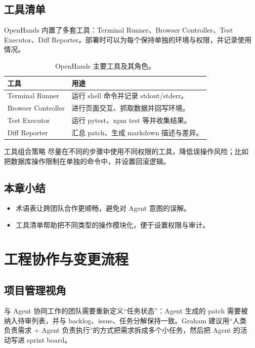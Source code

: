 \documentclass[a4paper]{article}
\begin{document}
\subsection{工具清单}
OpenHands 内置了多套工具：Terminal Runner、Browser Controller、Test Executor、Diff Reporter。部署时可以为每个保持单独的环境与权限，并记录使用情况。

\begin{table}[H]
\centering
\begin{tabular}{p{} p{}}
\toprule
工具 & 用途 \\
\midrule
Terminal Runner & 运行 shell 命令并记录 stdout/stderr。 \\
\midrule
Browser Controller & 进行页面交互、抓取数据并回写环境。 \\
\midrule
Test Executor & 运行 pytest、npm test 等并收集结果。 \\
\midrule
Diff Reporter & 汇总 patch、生成 markdown 描述与差异。 \\
\bottomrule
\end{tabular}
\caption{OpenHands 主要工具及其角色。}
\end{table}

\begin{knowledgebox}{工具组合策略}
尽量在不同的步骤中使用不同权限的工具，降低误操作风险；比如把数据库操作限制在单独的命令中，并设置回滚逻辑。
\end{knowledgebox}

\subsection{本章小结}
\begin{itemize}
    \item 术语表让跨团队合作更顺畅，避免对 Agent 意图的误解。
    \item 工具清单帮助把不同类型的操作模块化，便于设置权限与审计。
\end{itemize}

\section{工程协作与变更流程}
\subsection{项目管理视角}
与 Agent 协同工作的团队需要重新定义“任务状态”：Agent 生成的 patch 需要被纳入待审列表，并与 backlog、issue、任务分解保持一致。Graham 建议用“人类负责需求 + Agent 负责执行”的方式把需求拆成多个小任务，然后把 Agent 的活动写进 sprint board。
\end{document}
